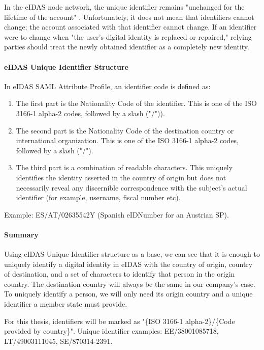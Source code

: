 In the eIDAS node network, the unique identifier remains "unchanged for the lifetime of the account" \cite{eidas-saml}. Unfortunately, it does not mean that identifiers cannot change; the account associated with that identifier cannot change. If an identifier were to change when "the user's digital identity is replaced or repaired," relying parties should treat the newly obtained identifier as a completely new identity.

\paragraph{eIDAS Unique Identifier Structure} In eIDAS SAML Attribute Profile, an identifier code is defined as:
\begin{enumerate}
  \item The first part is the Nationality Code of the identifier. This is one of the ISO 3166-1 alpha-2 codes, followed by a slash ("/")).
  \item The second part is the Nationality Code of the destination country or international organization. This is one of the ISO 3166-1 alpha-2 codes, followed by a slash ("/").
  \item The third part is a combination of readable characters. This uniquely identifies the identity asserted in the country of origin but does not necessarily reveal any discernible correspondence with the subject's actual identifier (for example, username, fiscal number etc).
\end{enumerate}

Example: ES/AT/02635542Y (Spanish eIDNumber for an Austrian SP).

\paragraph{Summary} Using eIDAS Unique Identifier structure as a base, we can see that it is enough to uniquely identify a digital identity in eIDAS with the country of origin, country of destination, and a set of characters to identify that person in the origin country. The destination country will always be the same in our company's case. To uniquely identify a person, we will only need its origin country and a unique identifier a member state must provide.

For this thesis, identifiers will be marked as "{\{ISO 3166-1 alpha-2\}}/{\{Code provided by country\}}". Unique identifier examples: EE/38001085718, LT/49003111045, SE/870314-2391.

